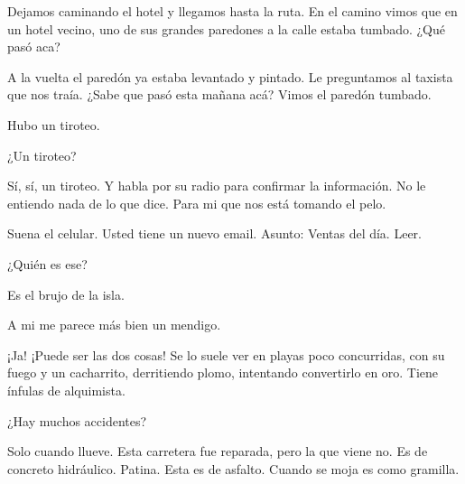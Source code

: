 \documentclass[12pt,twoside,openright,a5paper]{book}
\begin{document}
\begin{itemize}
Dejamos caminando el hotel y llegamos hasta la ruta. En el camino vimos que
en un hotel vecino, uno de sus grandes paredones a la calle estaba tumbado. ¿Qué pasó
aca?

A la vuelta el paredón ya estaba levantado y pintado. Le preguntamos
al taxista que nos traía. ¿Sabe que pasó esta mañana acá? Vimos el
paredón tumbado.

Hubo un tiroteo.

¿Un tiroteo?

Sí, sí, un tiroteo. Y
habla por su radio para confirmar la información. No le entiendo nada de
lo que dice. Para mi que nos está tomando el pelo.

\vspace{0.5cm}

\hrulefill\hspace{0.2cm} \decofourleft\decofourright \hspace{0.2cm} \hrulefill
\vspace{0.5cm}

Suena el celular. Usted tiene un nuevo email. Asunto: Ventas del día. Leer.

\vspace{0.5cm}

\hrulefill\hspace{0.2cm} \decofourleft\decofourright \hspace{0.2cm} \hrulefill
\vspace{0.5cm}

¿Quién es ese?

Es el brujo de la isla.

A mi me parece más bien un mendigo.

¡Ja! ¡Puede ser las dos cosas! Se lo suele ver en playas poco concurridas,
con su fuego y un cacharrito, derritiendo plomo, intentando convertirlo
en oro.  Tiene ínfulas de alquimista.

\vspace{0.5cm}

\hrulefill\hspace{0.2cm} \decofourleft\decofourright \hspace{0.2cm} \hrulefill
\vspace{0.5cm}

¿Hay muchos accidentes?

Solo cuando llueve. Esta carretera fue reparada, pero la que viene no. Es
de concreto hidráulico. Patina. Esta es de asfalto. Cuando se moja es
como gramilla.


\end{itemize}
\end{document}
